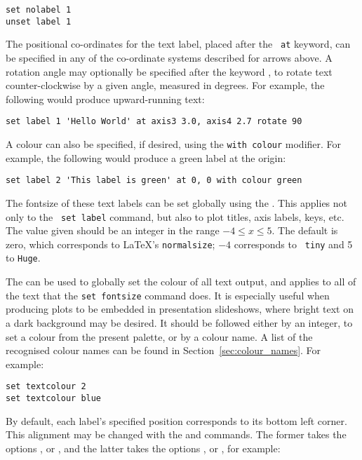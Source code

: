 \begin{verbatim}
set nolabel 1
unset label 1
\end{verbatim}

\noindent The positional co-ordinates for the text label, placed after the {\tt
at} keyword, can be specified in any of the co-ordinate systems described for
arrows above. A rotation angle may optionally be specified after the keyword
, to rotate text counter-clockwise by a given angle, measured
in degrees. For example, the following would produce upward-running text:

\begin{verbatim}
set label 1 'Hello World' at axis3 3.0, axis4 2.7 rotate 90
\end{verbatim}

A colour can also be specified, if desired, using the {\tt with colour}
modifier.  For example, the following would produce a green label at the origin:

\begin{verbatim}
set label 2 'This label is green' at 0, 0 with colour green
\end{verbatim}

 The fontsize of these text labels can be set
globally using the . This applies not only to the {\tt
set label} command, but also to plot titles, axis labels, keys, etc. The value
given should be an integer in the range $-4 \leq x \leq 5$. The default is
zero, which corresponds to \LaTeX's {\tt normalsize}; $-4$ corresponds to {\tt
tiny} and 5 to {\tt Huge}.

 The  can be
used to globally set the colour of all text output, and applies to all of the
text that the {\tt set fontsize} command does. It is especially useful when
producing plots to be embedded in presentation slideshows, where bright text on
a dark background may be desired. It should be followed either by an integer,
to set a colour from the present palette, or by a colour name. A list of the
recognised colour names can be found in Section~\ref{sec:colour_names}.  For
example:

\begin{verbatim}
set textcolour 2
set textcolour blue
\end{verbatim}

By default, each label's specified
position corresponds to its bottom left corner. This alignment may be changed
with the  and  commands. The
former takes the options ,  or ,
and the latter takes the options ,  or
, for example:

